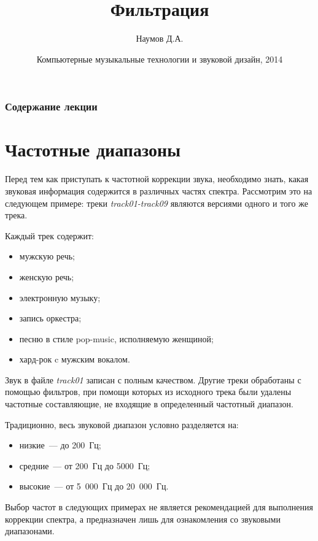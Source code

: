 \documentclass{beamer}
\title{Фильтрация}
\author{Наумов Д.А.}
\date[19.03.2014] {Компьютерные музыкальные технологии и звуковой дизайн, 2014}
\begin{document}
\begin{frame}
  \titlepage
\end{frame}

\begin{frame}
  \frametitle{Содержание лекции}
  \tableofcontents
\end{frame}

\section{Частотные диапазоны}
\begin{frame}
Перед тем как приступать к частотной коррекции звука, необходимо знать, какая звуковая информация содержится в различных частях спектра. Рассмотрим это на следующем примере: треки \emph{track01-track09} являются версиями одного и того же трека.

Каждый трек содержит:
\begin{itemize}
\item мужскую речь;
\item женскую речь;
\item электронную музыку;
\item запись оркестра;
\item песню в стиле pop-music, исполняемую женщиной;
\item хард-рок c мужским вокалом.
\end{itemize}

Звук в файле  \emph{track01} записан с полным качеством. Другие треки обработаны с помощью фильтров, при помощи которых из исходного трека были удалены частотные составляющие, не входящие в определенный частотный диапазон.
\end{frame}

\begin{frame}
Традиционно, весь звуковой диапазон условно разделяется на:
\begin{itemize}
\item низкие~--- до 200~Гц;
\item средние~--- от 200~Гц до 5000~Гц;
\item высокие~--- от 5~000~Гц до 20~000~Гц.
\end{itemize}
Выбор частот в следующих примерах не является рекомендацией для выполнения коррекции спектра, а предназначен лишь для ознакомления со звуковыми диапазонами.
\end{frame}
\end{document}

